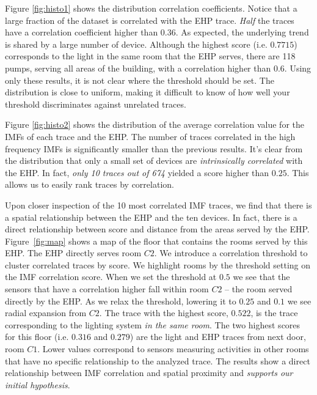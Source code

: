 Figure \ref{fig:histo1} shows the distribution correlation coefficients.  Notice
that a large fraction of the dataset is correlated with the EHP trace.
\emph{Half} the traces have a correlation coefficient higher than $0.36$.  As expected, the underlying
trend is shared by a large number of device.
Although the highest score (i.e. $0.7715$) corresponds to the light in the same room that the EHP serves,
there are 118 pumps, serving all areas of the building, with a correlation higher than $0.6$.
Using only these results, it is not clear where the threshold should be set.  The distribution is close to 
uniform, making it difficult to 
know of how well your threshold discriminates against unrelated traces.

Figure \ref{fig:histo2} shows the distribution of the average correlation value for the IMFs of
each trace and the EHP.  The number of traces correlated in the high frequency IMFs is significantly smaller
than the previous results. It's clear from the distribution that only a small set of devices are
\emph{intrinsically correlated} with the EHP.  In fact, \emph{only 10 traces out of 674} yielded a score higher than 
$0.25$. This allows us to easily rank traces by correlation.

Upon closer inspection of the 10 most correlated IMF traces, we find that there is a spatial relationship
between the EHP and the ten devices.  In fact, there is a direct relationship between score and distance from
the areas served by the EHP.  Figure~\ref{fig:map} shows a map of the floor that contains the rooms served by this
EHP.  The EHP directly serves room $C2$.  We introduce a correlation threshold to cluster correlated traces by score.
We highlight rooms by the threshold setting on the IMF correlation score.
When we set the threshold at $0.5$ we see that the sensors that have a correlation higher fall within room $C2$ --
the room served directly by the EHP.  As we relax the threshold, lowering it to $0.25$ and $0.1$ we see radial expansion from $C2$.  The trace with the highest score, $0.522$, is the trace corresponding to the lighting system \emph{in
the same room}.
The two highest scores for this floor (i.e. $0.316$ and $0.279$) are the light and EHP traces from next door, room $C1$.
Lower values correspond to sensors measuring activities in other rooms that have no specific relationship to the analyzed trace.  The results show a direct relationship between IMF correlation and spatial proximity and \emph{supports our initial
hypothesis}.

